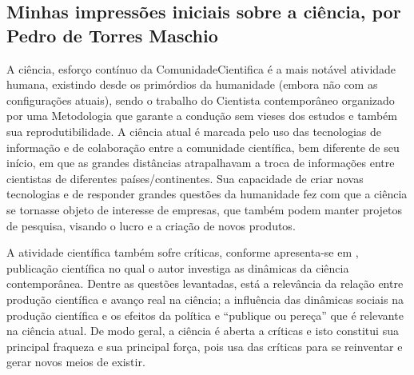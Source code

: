 \subsection{Minhas impressões iniciais sobre a ciência, por Pedro de Torres Maschio}

A ciência, esforço contínuo da \gls{ComunidadeCientifica} é a mais notável atividade humana, existindo desde os primórdios da humanidade (embora não com as configurações atuais), sendo o trabalho do \gls{Cientista} contemporâneo organizado por uma  \gls{Metodologia} que garante a condução sem vieses dos estudos e também sua reprodutibilidade. A ciência atual é marcada pelo uso das tecnologias de informação e de colaboração entre a comunidade científica, bem diferente de seu início, em que as grandes distâncias atrapalhavam a troca de informações entre cientistas de diferentes países/continentes. Sua capacidade de criar novas tecnologias e de responder grandes questões da humanidade fez com que a ciência se tornasse objeto de interesse de empresas, que também podem manter projetos de pesquisa, visando o lucro e a criação de novos produtos.

A atividade científica também sofre críticas, conforme apresenta-se em \citep{chavalarias_whats_2017}, publicação científica no qual o autor investiga as dinâmicas da ciência contemporânea. Dentre as questões levantadas, está a relevância da relação entre produção científica e avanço real na ciência; a influência das dinâmicas sociais na produção científica e os efeitos da política e “publique ou pereça” que é relevante na ciência atual. De modo geral, a ciência é aberta a críticas e isto constitui sua principal fraqueza e sua principal força, pois usa das críticas para se reinventar e gerar novos meios de existir.